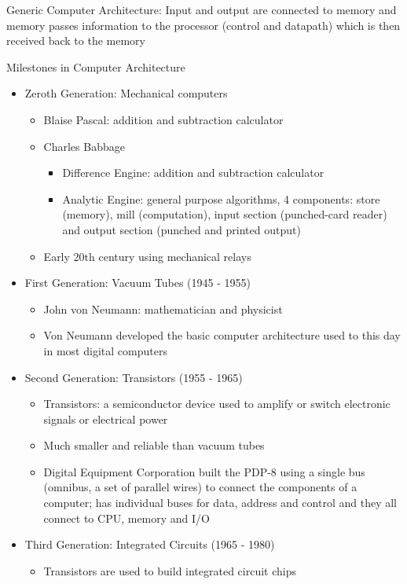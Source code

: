 \documentclass[12pt]{article}
\begin{document}
\begin{definition} Generic Computer Architecture: Input and output are connected to memory and memory passes information to the processor (control and datapath) which is then received back to the memory \end{definition} 
Milestones in Computer Architecture \begin{itemize} 
\item Zeroth Generation: Mechanical computers \begin{itemize} 
\item Blaise Pascal: addition and subtraction calculator 
\item Charles Babbage \begin{itemize} 
\item Difference Engine: addition and subtraction calculator 
\item Analytic Engine: general purpose algorithms, 4 components: store (memory), mill (computation), input section (punched-card reader) and output section (punched and printed output) \end{itemize} 
\item Early 20th century using mechanical relays \end{itemize} 
\item First Generation: Vacuum Tubes (1945 - 1955) \begin{itemize} 
\item John von Neumann: mathematician and physicist 
\item Von Neumann developed the basic computer architecture used to this day in most digital computers \end{itemize} 
\item Second Generation: Transistors (1955 - 1965) \begin{itemize} 
\item Transistors: a semiconductor device used to amplify or switch electronic signals or electrical power 
\item Much smaller and reliable than vacuum tubes 
\item Digital Equipment Corporation built the PDP-8 using a single bus (omnibus, a set of parallel wires) to connect the components of a computer; has individual buses for data, address and control and they all connect to CPU, memory and I/O \end{itemize} 
\item Third Generation: Integrated Circuits (1965 - 1980) \begin{itemize} 
\item Transistors are used to build integrated circuit chips

\end{itemize}
\end{itemize}
\end{document}

